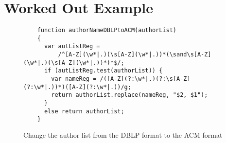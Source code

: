 
\section{Worked Out Example}\label{sec:mot}


\begin{figure*}[htbp]
\begin{center}
{
\small
\begin{verbatim}
    function authorNameDBLPtoACM(authorList)
    {
      var autListReg = 
          /^[A-Z](\w*|.)(\s[A-Z](\w*|.))*(\sand\s[A-Z](\w*|.)(\s[A-Z](\w*|.))*)*$/;
      if (autListReg.test(authorList)) {
        var nameReg = /([A-Z](?:\w*|.)(?:\s[A-Z](?:\w*|.))*)([A-Z](?:\w*|.))/g;
        return authorList.replace(nameReg, "$2, $1");
      }
      else return authorList;
    }
\end{verbatim}
}
\end{center}
\caption{Change the author list from the DBLP format to the ACM format}
\label{fig-run-exmp}
\vspace{-2mm}
\end{figure*}



